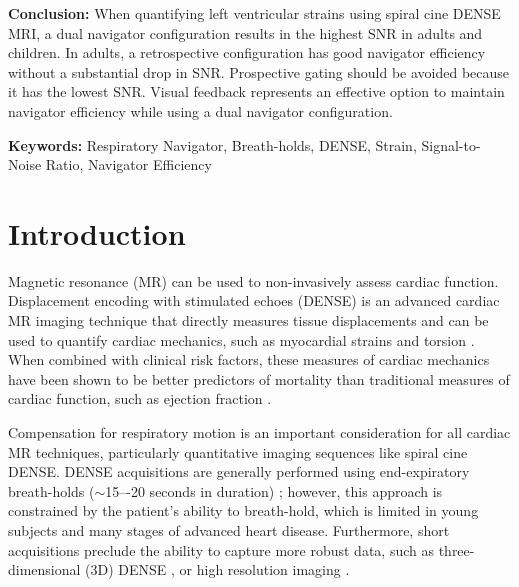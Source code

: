 	\noindent \textbf{Conclusion:} When quantifying left ventricular strains using spiral cine DENSE MRI, a dual navigator configuration results in the highest SNR in adults and children. In adults, a retrospective configuration has good navigator efficiency without a substantial drop in SNR. Prospective gating should be avoided because it has the lowest SNR. Visual feedback represents an effective option to maintain navigator efficiency while using a dual navigator configuration.
	
	\noindent \textbf{Keywords:} Respiratory Navigator, Breath-holds, DENSE, Strain, Signal-to-Noise Ratio, Navigator Efficiency\\
	
	\newpage

\section{Introduction}
	Magnetic resonance (MR) can be used to non-invasively assess cardiac function. Displacement encoding with stimulated echoes (DENSE) is an advanced cardiac MR imaging technique that directly measures tissue displacements and can be used to quantify cardiac mechanics, such as myocardial strains and torsion \cite{Aletras1999,Aletras1999a}. When combined with clinical risk factors, these measures of cardiac mechanics have been shown to be better predictors of mortality than traditional measures of cardiac function, such as ejection fraction \cite{Stanton2009}.
	 
	Compensation for respiratory motion is an important consideration for all cardiac MR techniques, particularly quantitative imaging sequences like spiral cine DENSE. DENSE acquisitions are generally performed using end-expiratory breath-holds ($\sim$15–-20 seconds in duration) \cite{Kim2004,Zhong2006,Ernande2012,Zhong2010a,Aletras2005,Spottiswoode2007,Young2012c}; however, this approach is constrained by the patient's ability to breath-hold, which is limited in young subjects and many stages of advanced heart disease. Furthermore, short acquisitions preclude the ability to capture more robust data, such as three-dimensional (3D) DENSE \cite{Zhong2010a,Kar2014,Auger2012}, or high resolution imaging \cite{Wehner2014}.
	
